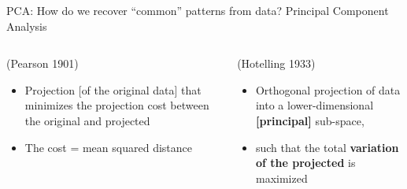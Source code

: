 \documentclass[
  ignorenonframetext,
  aspectratio=169]{beamer}
\begin{document}
\begin{frame}{PCA: How do we recover ``common'' patterns from data?}
\protect\hypertarget{pca-how-do-we-recover-common-patterns-from-data}{}
Principal Component Analysis

\begin{columns}[T]
\begin{column}{.45\textwidth}
\begin{block}{(Pearson 1901)}
\protect\hypertarget{pearson-1901}{}
\begin{itemize}
\item
  Projection {[}of the original data{]} that minimizes the projection
  cost between the original and projected
\item
  The cost = mean squared distance
\end{itemize}
\end{block}
\end{column}

\begin{column}{.45\textwidth}
\begin{block}{(Hotelling 1933)}
\protect\hypertarget{hotelling-1933}{}
\begin{itemize}
\item
  Orthogonal projection of data into a lower-dimensional
  \textbf{{[}principal{]}} sub-space,
\item
  such that the total \textbf{variation of the projected} is maximized
\end{itemize}
\end{block}
\end{column}
\end{columns}
\end{frame}
\end{document}
